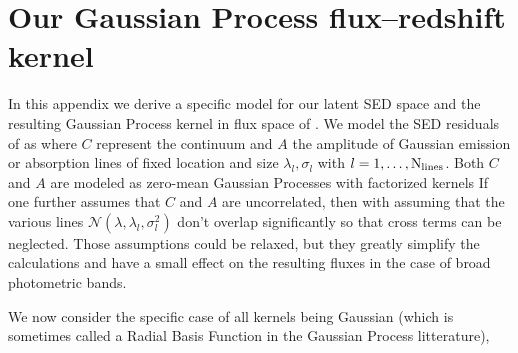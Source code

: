 \documentclass[aps,prd,showpacs,superscriptaddress,groupedaddress]{revtex4}  %
\begin{document}
\section{Our Gaussian Process flux--redshift kernel}\label{sec:rbfgp}

In this appendix we derive a specific model for our latent SED space and the resulting Gaussian Process kernel in flux space of .
We model the SED residuals of  as
where $C$ represent the continuum and $A$ the amplitude of Gaussian emission or absorption lines of fixed location and size $ \lambda_l, \sigma_l$ with $l = 1, \ldots, {\rm N}_{\rm lines}$. 
Both $C$ and $A$ are modeled as zero-mean Gaussian Processes with factorized kernels
If one further assumes that $C$ and $A$ are uncorrelated, then 
with 
assuming that the various lines $\mathcal{N}(\lambda, \lambda_l, \sigma^2_l)$ don't overlap significantly so that cross terms can be neglected. 
Those assumptions could be relaxed, but they greatly simplify the calculations and have a small effect on the resulting fluxes in the case of broad photometric bands.

We now consider the specific case of all kernels being Gaussian (which is sometimes called a Radial Basis Function in the Gaussian Process litterature),
\end{document}
